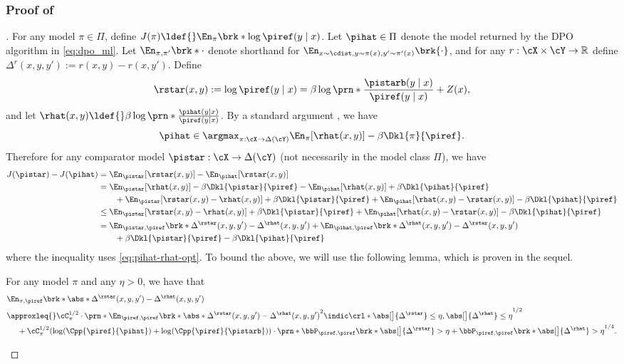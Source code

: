 \subsubsection{Proof of \protect{}}
\begin{proof}[]
For any model $\pi\in\Pi$, define $J(\pi)\ldef{} \En_{\pi}\brk*{\log\piref(y\mid{}x)}$. Let
$\pihat\in\Pi$ denote the model returned by the DPO algorithm in \cref{eq:dpo_ml}.
Let
$\En_{\pi,\pi'}\brk*{\cdot}$ denote shorthand for
$\En_{x\sim\cdist,y\sim\pi(x),y'\sim\pi'(x)}\brk{\cdot}$, and for any $r:\cX\times\cY\to\mathbb{R}$ define
$\Delta^{r}(x,y,y'):=r(x,y) - r(x,y')$. Define
\[\rstar(x,y):=\log\piref(y\mid{}x)=\beta\log\prn*{\frac{\pistarb(y\mid{}x)}{\piref(y\mid{}x)}}+Z(x),\]
and let $\rhat(x,y) \ldef{}
\beta\log\prn*{\frac{\pihat(y\mid{}x)}{\piref(y\mid{}x)}}$. By a
standard argument \citep{huang2024correcting}, we have
\begin{align}\pihat \in \argmax_{\pi:\cX\to\Delta(\cY)} \En_{\pi}[\rhat(x,y)] - \beta \Dkl{\pi}{\piref}.\label{eq:pihat-rhat-opt}\end{align}
Therefore for any comparator model $\pistar: \cX \to \Delta(\cY)$ (not
necessarily in the model class $\Pi$), we have
\begin{align}
J(\pistar) - J(\pihat)
&= \En_{\pistar}[\rstar(x,y)] - \En_{\pihat}[\rstar(x,y)] \\ 
&= \En_{\pistar}[\rhat(x,y)] - \beta\Dkl{\pistar}{\piref} - \En_{\pihat}[\rhat(x,y)] + \beta\Dkl{\pihat}{\piref} \\
&\qquad+ \En_{\pistar}[\rstar(x,y)-\rhat(x,y)] + \beta\Dkl{\pistar}{\piref} + \En_{\pihat}[\rhat(x,y)-\rstar(x,y)] - \beta\Dkl{\pihat}{\piref} \\ 
&\leq \En_{\pistar}[\rstar(x,y)-\rhat(x,y)] + \beta\Dkl{\pistar}{\piref} + \En_{\pihat}[\rhat(x,y)-\rstar(x,y)] - \beta\Dkl{\pihat}{\piref} \\ 
&= \En_{\pistar,\piref}\brk*{\Delta^{\rstar}(x,y,y') -
  \Delta^{\rhat}(x,y,y')}
  + \En_{\pihat,\piref}\brk*{\Delta^{\rhat}(x,y,y') -
  \Delta^{\rstar}(x,y,y')}\\
  &\qquad+ \beta\Dkl{\pistar}{\piref} - \beta\Dkl{\pihat}{\piref} \label{eq:j-regret-decomp}
\end{align}
where the inequality uses \cref{eq:pihat-rhat-opt}. To bound the \rhs
above, we will use the following lemma, which is proven in the sequel.
\begin{lemma}
\label{lem:com}
For any model $\pi$ and any $\eta>0$, we have that
\begin{align}
&\En_{\pi,\piref}\brk*{\abs*{\Delta^{\rstar}(x,y,y') -
\Delta^{\rhat}(x,y,y')}}\\
&\approxleq{}           \cC_{\pi}^{1/2}\cdot\prn*{\En_{\piref,\piref}\brk*{\abs*{\Delta^{\rstar}(x,y,y') -
    \Delta^{\rhat}(x,y,y')}^2\indic\crl*{\abs[\big]{\Delta^{\rstar}}\leq\eta,
    \abs[\big]{\Delta^{\rhat}}\leq\eta}}}^{1/2}\\
&~~~~
+ \cC_{\pi}^{1/2}(\log(\Cpp{\piref}{\pihat})+\log(\Cpp{\piref}{\pistarb}))\cdot\prn*{\bbP_{\piref,\piref}\brk*{\abs[\big]{\Delta^{\rstar}}>\eta}
  +
  \bbP_{\piref,\piref}\brk*{\abs[\big]{\Delta^{\rhat}}>\eta}}^{1/4}.
\end{align}



\end{lemma}
\end{proof}
